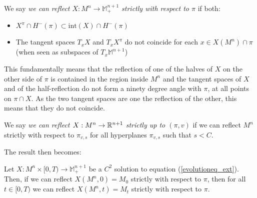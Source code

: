 \begin{defin}
	We say {\em we can reflect $X: M^n\rightarrow \mathbb{M}^{n+1}_+$ strictly with respect to $\pi$} if both:
	\begin{itemize}
		\item $X^\pi\cap H^-(\pi)\subset \mathrm{int}(X)\cap H^-(\pi)$ 
		\item The tangent spaces $T_xX$ and $T_xX^\pi$ do not coincide for each $x\in X(M^n) \cap \pi$ (when seen as subspaces of  $T_x\mathbb{M}^{n+1}$)
	\end{itemize} 
\end{defin}
This fundamentally means that the reflection of one of the halves of $X$ on the other side of $\pi$ is contained in the region inside $M^n$ and the tangent spaces of $X$ and of the half-reflection do not form a ninety degree angle with $\pi$, at all points on $\pi\cap X$. As the two tangent spaces are one the reflection of the other, this means that they do not coincide.   
\begin{defin}
	We say {\em we can reflect $X: M^n\rightarrow \mathbb{R}^{n+1}$ strictly up to $(\pi,v)$} if we can reflect $M^n$ strictly with respect to $\pi_{v, s}$ for all hyperplanes $\pi_{v, s}$ such that $s<C$.  
\end{defin}

The result then becomes:


\begin{theorem}\label{chow gulliver extended}
	Let $X:M^n\times [0,T) \rightarrow \mathbb{M}^{n+1}_+$ be a $C^2$ solution to equation (\ref{evolutioneq_ext}). Then, if we can reflect $X(M^n, 0)=M_0$ strictly with respect to $\pi$, then for all $t\in [0,T)$ we can reflect $X(M^n, t)=M_t$ strictly with respect to $\pi$. 
\end{theorem}

